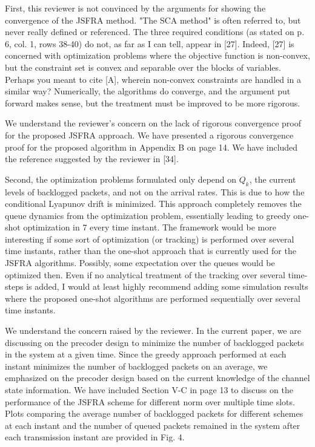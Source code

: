 \begin{itemize}

 First, this reviewer is not convinced by the arguments for showing the convergence of the JSFRA method. "The SCA method" is often referred to, but never really defined or referenced. The three required conditions (as stated on p. 6, col. 1, rows 38-40) do not, as far as I can tell, appear in [27]. Indeed, [27] is concerned with optimization problems where the objective function is non-convex, but the constraint set is convex and separable over the blocks of variables. Perhaps you meant to cite [A], wherein non-convex constraints are handled in a similar way? Numerically, the algorithms do converge, and the argument put forward makes sense, but the treatment must be improved to be more rigorous.

\resp We understand the reviewer's concern on the lack of rigorous convergence proof for the proposed JSFRA approach. We have presented a rigorous convergence proof for the proposed algorithm in Appendix B on page 14. We have included the reference suggested by the reviewer in [34]. 

 Second, the optimization problems formulated only depend on $Q_k$, the current levels of backlogged packets, and not on the arrival rates. This is due to how the conditional Lyapunov drift is minimized. This approach completely removes the queue dynamics from the optimization problem, essentially leading to greedy one-shot optimization in 7
every time instant. The framework would be more interesting if some sort of optimization (or tracking) is performed over several time instants, rather than the one-shot approach that is currently used for the JSFRA algorithms. Possibly, some expectation over the queues would be optimized then. Even if no analytical treatment of the tracking over several time-steps is added, I would at least highly recommend adding some simulation results where the proposed one-shot algorithms are performed sequentially over several time instants.

\resp We understand the concern raised by the reviewer. In the current paper, we are discussing on the precoder design to minimize the number of backlogged packets in the system at a given time. Since the greedy approach performed at each instant minimizes the number of backlogged packets on an average, we emphasized on the precoder design based on the current knowledge of the channel state information. We have included Section V-C in page 13 to discuss on the performance of the JSFRA scheme for different  norm over multiple time slots. Plots comparing the average number of backlogged packets for different schemes at each instant and the number of queued packets remained in the system after each transmission instant are provided in Fig. 4.


\end{itemize}
